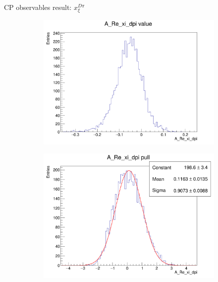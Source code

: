 \documentclass{beamer}
\begin{document}
\begin{frame}{CP observables result: $x_\xi^{D\pi}$}
  \begin{figure}
    \centering
    \begin{subfigure}{0.42\textwidth}
      \includegraphics[width = 1.0\textwidth]{Plots/A_Re_xi_dpi_value.png}
    \end{subfigure}
    \begin{subfigure}{0.42\textwidth}
      \includegraphics[width = 1.0\textwidth]{Plots/A_Re_xi_dpi_pull.png}
    \end{subfigure}%
    \begin{subfigure}{0.42\textwidth}

\end{subfigure}
\end{figure}
\end{frame}
\end{document}
